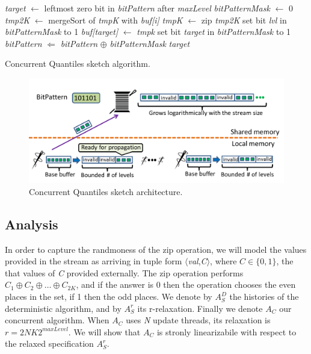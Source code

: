 \begin{algorithm}[tb]
\begin{algorithmic}[1]
\State \emph{target} $\leftarrow$ leftmost zero bit in \emph{bitPattern} after \emph{maxLevel}
\State \emph{bitPatternMask} $\leftarrow$ 0
		\State \emph{tmp2K} $\leftarrow$ mergeSort of \emph{tmpK} with \emph{buf[i]}
		\State \emph{tmpK} $\leftarrow$ zip \emph{tmp2K} \label{l:zip}
		\State set bit \emph{lvl} in \emph{bitPatternMask} to 1
\EndFor
\State \emph{buf[target]} $\leftarrow$ \emph{tmpk}
\State set bit \emph{target} in \emph{bitPatternMask} to 1
\State \emph{bitPattern} $\Leftarrow$ \emph{bitPattern} $\oplus$ \emph{bitPatternMask}
\State \Return \emph{target}
\EndProcedure

\end{algorithmic}
\caption{Concurrent Quantiles sketch algorithm.}
\label{alg:concurrent-theta}
\end{algorithm}


\begin{figure}[H]
    \centering
    \includegraphics[width=5in]{images/cocurrentQuntiles.png}
    \caption{Concurrent Quantiles sketch architecture.}
    \label{cocurrentQuntiles}
\end{figure}


\subsection{Analysis}
In order to capture the randmoness of the zip operation, we will model the values provided in the stream
as arriving in tuple form $\langle$\emph{val},\emph{C}$\rangle$, where $C\in\{0,1\}$, the that values of
\emph{C} provided externally. The zip operation performs $C_1 \oplus C_2 \oplus \dots \oplus C_{2K}$, and if
the answer is 0 then the operation chooses the even places in the set, if 1 then the odd places. We denote
by $A_S^D$ the histories of the deterministic algorithm, and by $A_S^r$ its r-relaxation. Finally we denote
$A_C$ our concurrent algorithm.
When $A_C$ uses \emph{N} update threads, its relaxation is $r=2NK2^{maxLevel}$. We 
will show that $A_C$ is stronly linearizabile with respect to the relaxed specification $A_S^r$.

